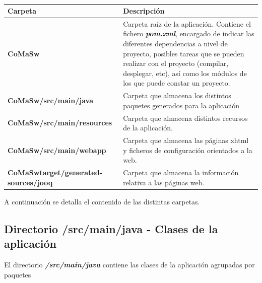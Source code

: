 \begin{table} [H]
    \centering
    \setlength{\leftmargini}{0.4cm}
	\resizebox{14cm}{!} { %
    \begin{tabular}{| m{4.5cm} | m{9.5cm} |}   
    \hline
	  \textbf{Carpeta} & \textbf{Descripción} 
	  \\\hline
	  \textbf{CoMaSw} & Carpeta raíz de la aplicación. Contiene el fichero \textit{\textbf{pom.xml}}, encargado de indicar las diferentes dependencias a nivel de proyecto, posibles tareas que se pueden realizar con el proyecto (compilar, desplegar, etc), así como los módulos de los que puede constar un proyecto.
	  \\\hline
	  \textbf{CoMaSw/src/main/java} & Carpeta que almacena los distintos paquetes generados para la aplicación
	  \\\hline
	  \textbf{CoMaSw/src/main/resources} & Carpeta que almacena distintos recursos de la aplicación.
	  \\\hline
	  \textbf{CoMaSw/src/main/webapp} & Carpeta que almacena las páginas \acrshort{xhtml} y ficheros de configuración orientados a la web.
	  \\\hline
	  \textbf{CoMaSwtarget/generated-sources/jooq} & Carpeta que almacena la información relativa a las páginas web.
	  \\\hline
    \end{tabular}
    } %
    \caption{}
    \label{tab:cu-gestión-usuarios}
\end{table}


A continuación se detalla el contenido de las distintas carpetas.

\subsection{Directorio /src/main/java - Clases de la aplicación}
\label{sub:clases}
El directorio \textit{\textbf{/src/main/java}} contiene las clases de la aplicación agrupadas por paquetes



